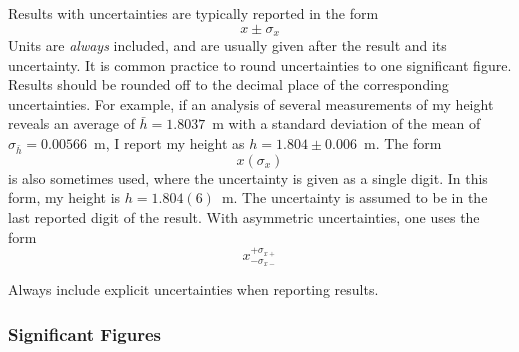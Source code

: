 \documentclass[12pt]{article}
\begin{document}
Results with uncertainties are typically reported in the form
\begin{equation}
x \pm \sigma_x 
\end{equation}
Units are \textit{always} included, and are usually given after the
result and its uncertainty. It is common practice to round
uncertainties to one significant figure. Results should be rounded off
to the decimal place of the corresponding uncertainties. For example,
if an analysis of several measurements of my height reveals an average
of $\bar{h} = 1.8037$~m with a standard deviation of the mean of
$\sigma_{\bar{h}} = 0.00566$~m, I report my height as $h = 1.804 \pm
0.006$~m. The form
\begin{equation}
x(\sigma_x)
\end{equation}
is also sometimes used, where the uncertainty is given as a single
digit. In this form, my height is $h = 1.804(6)$~m. The uncertainty is
assumed to be in the last reported digit of the result. With
asymmetric uncertainties, one uses the form 
\begin{equation}
x^{+\sigma_{x+}}_{-\sigma_{x-}}
\end{equation}

Always include explicit uncertainties when reporting results.

\subsubsection*{Significant Figures}
\end{document}
